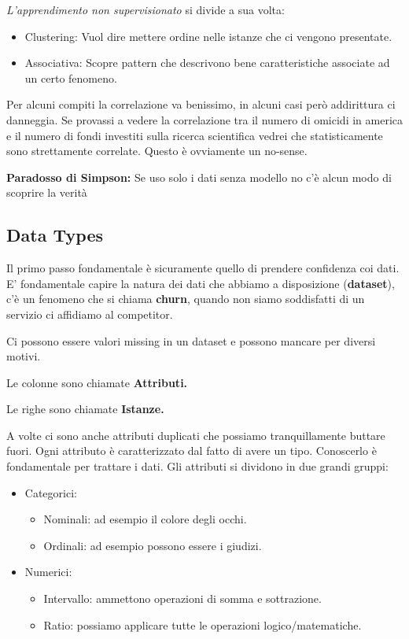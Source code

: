 \textit{L'apprendimento non supervisionato} si divide a sua volta:
\begin{itemize}
	\item Clustering: Vuol dire mettere ordine nelle istanze che ci vengono presentate.
	\item Associativa: Scopre pattern che descrivono bene caratteristiche associate ad un certo fenomeno.
\end{itemize}

Per alcuni compiti la correlazione va benissimo, in alcuni casi però addirittura ci danneggia. Se provassi a vedere la correlazione tra il numero di omicidi in america e il numero di fondi investiti sulla ricerca scientifica vedrei che statisticamente sono strettamente correlate. Questo è ovviamente un no-sense.

\textbf{Paradosso di Simpson:} Se uso solo i dati senza modello no c'è alcun modo di scoprire la verità


\subsection{Data Types}

Il primo passo fondamentale è sicuramente quello di prendere confidenza coi dati. E' fondamentale capire la natura dei dati che abbiamo a disposizione (\textbf{dataset}), c'è un fenomeno che si chiama \textbf{churn}, quando non siamo soddisfatti di un servizio ci affidiamo al competitor.

Ci possono essere valori missing in un dataset e possono mancare per diversi motivi.

Le colonne sono chiamate \textbf{Attributi.}

Le righe sono chiamate \textbf{Istanze.}

A volte ci sono anche attributi duplicati che possiamo tranquillamente buttare fuori.
Ogni attributo è caratterizzato dal fatto di avere un tipo. Conoscerlo è fondamentale per trattare i dati.
Gli attributi si dividono in due grandi gruppi:
\begin{itemize}
	\item Categorici:
	\begin{itemize}
		\item Nominali: ad esempio il colore degli occhi.
		\item Ordinali: ad esempio possono essere i giudizi.
	\end{itemize}
	\item Numerici:
	\begin{itemize}
		\item Intervallo: ammettono operazioni di somma e sottrazione. 
		\item Ratio: possiamo applicare tutte le operazioni logico/matematiche.
	\end{itemize}
\end{itemize}

